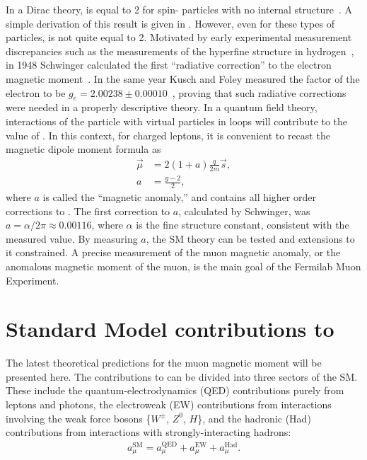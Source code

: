 In a Dirac theory, \g is equal to 2 for spin-\textonehalf\xspace particles with no internal structure~\cite{Dirac}. A simple derivation of this result is given in . However, even for these types of particles, \g is not quite equal to 2. Motivated by early experimental measurement discrepancies such as the measurements of the hyperfine structure in hydrogen~\cite{EarlyHyperfine1}, in 1948 Schwinger calculated the first ``radiative correction'' to the electron magnetic moment~\cite{Schwinger}. In the same year Kusch and Foley measured the \g factor of the electron to be $g_{e} = 2.00238 \pm 0.00010$~\cite{KuschFoley1,KuschFoley2}, proving that such radiative corrections were needed in a properly descriptive theory. In a quantum field theory, interactions of the particle with virtual particles in loops will contribute to the value of \g. In this context, for charged leptons, it is convenient to recast the magnetic dipole moment formula as 
		\begin{equation}
		\begin{aligned}
            \vec{\mu} &= 2(1+a) \frac{q}{2m} \vec{s}, \\
            a &= \frac{g-2}{2},
        \label{eq:anamoly}
		\end{aligned}
		\end{equation}
where $a$ is called the ``magnetic anomaly,'' and contains all higher order corrections to \g. The first correction to $a$, calculated by Schwinger, was $a = \alpha/2\pi \approx 0.00116$, where $\alpha$ is the fine structure constant, consistent with the measured value. By measuring $a$, the SM theory can be tested and extensions to it constrained. A precise measurement of the muon magnetic anomaly, or the anomalous magnetic moment of the muon, is the main goal of the Fermilab Muon \gmtwo Experiment.


\section{Standard Model contributions to \amu}
\label{sec:Theory}

The latest theoretical predictions for the muon magnetic moment will be presented here. The contributions to \amu can be divided into three sectors of the SM. These include the quantum-electrodynamics (QED) contributions purely from leptons and photons, the electroweak (EW) contributions from interactions involving the weak force bosons \{$W^{\pm}$, $Z^{0}$, $H$\}, and the hadronic (Had) contributions from interactions with strongly-interacting hadrons:
		\begin{align}
            a_{\mu}^{\text{SM}} = a_{\mu}^{\text{QED}} + a_{\mu}^{\text{EW}} + a_{\mu}^{\text{Had}}.
		\end{align}


